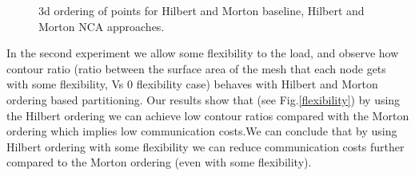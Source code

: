 \documentclass[a0,landscape]{a0poster}
\begin{document}
\begin{multicols}{4}
\begin{figure}[H]
\centering
{}
\caption{3d ordering of points for Hilbert and Morton baseline, Hilbert and Morton NCA approaches.\label{3d_NCA}}
\end{figure}
% 

In the second experiment we allow some flexibility to the load, and observe how contour ratio (ratio between the surface area of the mesh that each node gets with some flexibility, Vs 0 flexibility case)
behaves with Hilbert and Morton ordering based partitioning. Our results show that (see Fig.\ref{flexibility}) by using the Hilbert ordering we can achieve low contour ratios compared with the Morton ordering which implies low
communication costs.We can conclude that by using Hilbert ordering with some flexibility we can reduce communication costs further compared to the Morton ordering (even with some flexibility).


\end{multicols}
\end{document}
